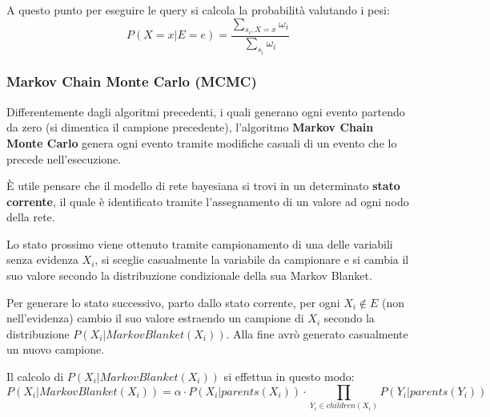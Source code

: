 A questo punto per eseguire le query si calcola la probabilità valutando i pesi:
\begin{equation*}
    P(X = x | E = e) = \frac{\sum_{s_i, X=x} \omega_i}{\sum_{s_i} \omega_i}
\end{equation*}
\subsubsection{Markov Chain Monte Carlo (MCMC)}
Differentemente dagli algoritmi precedenti, i quali generano ogni evento partendo
da zero (si dimentica il campione precedente), l'algoritmo \textbf{Markov Chain Monte Carlo} 
genera ogni evento tramite modifiche casuali di un evento che lo precede nell'esecuzione.

È utile pensare che il modello di rete bayesiana si trovi in un determinato
\textbf{stato corrente}, il quale è identificato tramite l'assegnamento di un
valore ad ogni nodo della rete.

Lo stato prossimo viene ottenuto tramite campionamento di una delle variabili
senza evidenza $X_i$, si sceglie casualmente la variabile da campionare e si 
cambia il suo valore secondo la distribuzione condizionale della sua Markov Blanket.

Per generare lo stato successivo, parto dallo stato corrente, per ogni $X_i \not \in E$
(non nell'evidenza) cambio il suo valore estraendo un campione di $X_i$ secondo 
la distribuzione $P(X_i | MarkovBlanket(X_i))$. Alla fine avrò generato casualmente 
un nuovo campione.

Il calcolo di $P(X_i | MarkovBlanket(X_i))$ si effettua in questo modo:
\begin{equation}
    P(X_i | MarkovBlanket(X_i)) = \alpha \cdot P(X_i | parents(X_i)) \cdot 
    \prod_{Y_i\in children(X_i)} P(Y_i| parents(Y_i))
\end{equation}
